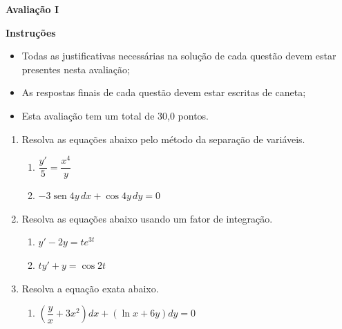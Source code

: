 \documentclass[12pt,a4paper]{article}
\DeclareMathOperator{\sen}{sen}
\begin{document}
\begin{center}
 \textbf{Avaliação I}
\end{center}

\textbf{Instruções}
\begin{itemize}
 \item Todas as justificativas necessárias na solução de cada questão devem 
 estar presentes nesta avaliação;
 \item As respostas finais de cada questão devem estar escritas de caneta;
 \item Esta avaliação tem um total de 30,0 pontos.
\end{itemize}

\begin{enumerate}
  \item Resolva as equações abaixo pelo método da separação de variáveis.

  \begin{enumerate}
    \item $\dfrac{y'}{5} = \dfrac{x^4}{y}$
    \item $-3 \sen 4y\,dx + \cos 4y\,dy = 0$
  \end{enumerate}

  \item Resolva as equações abaixo usando um fator de integração.

  \begin{enumerate}
    \item $y' - 2y = te^{3t}$
    \item $ty' + y = \cos 2t$
  \end{enumerate}

  \item Resolva a equação exata abaixo.

  \begin{enumerate}
    \item $\left(\dfrac{y}{x} + 3x^2\right)dx + (\ln x + 6y)dy = 0$
  \end{enumerate}
  
\end{enumerate}
\end{document}
